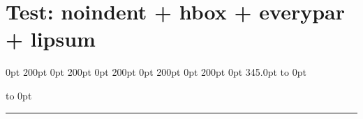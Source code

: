 \documentclass[11pt,a4paper]{article}
\begin{document}
\section{Test: noindent + hbox + everypar + lipsum}

\noindent
{} 0pt 200pt 0pt 200pt 0pt 200pt 0pt 200pt 0pt 200pt 0pt 345.0pt\relax
\hbox to 0pt{\vbox to 0pt{\color{red}\rule{50pt}{50pt}\vss}\hss}%
%
\lipsum[1]
\lipsum[2]

\everypar{}%
\end{document}
